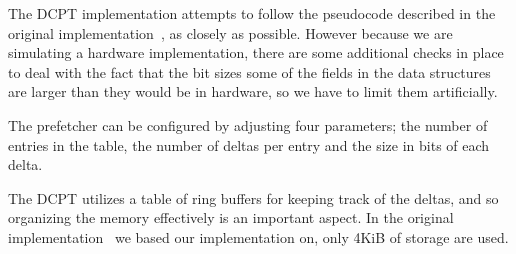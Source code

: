 
The DCPT implementation attempts to follow the pseudocode described in the
original implementation~\cite{dcpt}, as closely as possible. However because we
are simulating a hardware implementation, there are some additional checks in
place to deal
with the fact that the bit sizes some of the fields in the data
structures are larger than they would be in hardware, so we have to limit them
artificially.

The prefetcher can be configured by adjusting four parameters; the number of entries
in the table, the number of deltas per entry and the size in bits of each delta.

The DCPT utilizes a table of ring buffers for keeping track of the deltas, and
so organizing the memory effectively is an important aspect. In the original
implementation~\cite{dcpt} we based our implementation on, only 4KiB of storage
are used.

